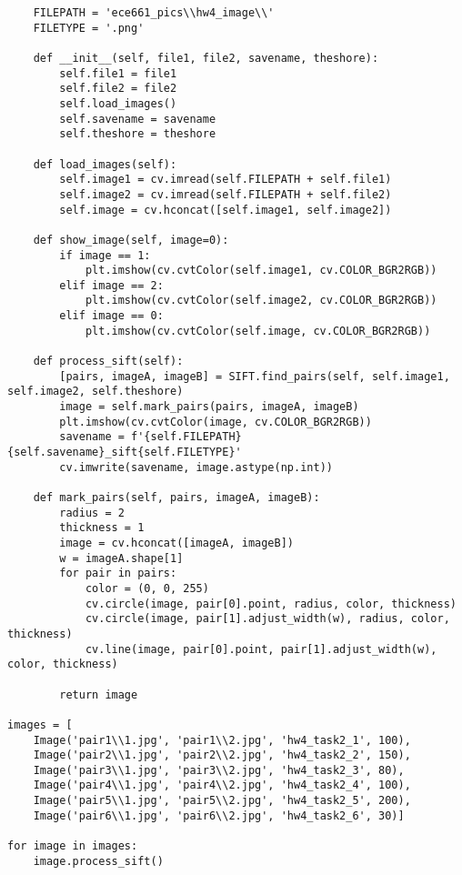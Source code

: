 \documentclass[11pt]{article}
\begin{document}
\begin{lstlisting}
    FILEPATH = 'ece661_pics\\hw4_image\\'
    FILETYPE = '.png'

    def __init__(self, file1, file2, savename, theshore):
        self.file1 = file1
        self.file2 = file2
        self.load_images()
        self.savename = savename
        self.theshore = theshore

    def load_images(self):
        self.image1 = cv.imread(self.FILEPATH + self.file1)
        self.image2 = cv.imread(self.FILEPATH + self.file2)
        self.image = cv.hconcat([self.image1, self.image2])

    def show_image(self, image=0):
        if image == 1:
            plt.imshow(cv.cvtColor(self.image1, cv.COLOR_BGR2RGB))
        elif image == 2:
            plt.imshow(cv.cvtColor(self.image2, cv.COLOR_BGR2RGB))
        elif image == 0:
            plt.imshow(cv.cvtColor(self.image, cv.COLOR_BGR2RGB))

    def process_sift(self):
        [pairs, imageA, imageB] = SIFT.find_pairs(self, self.image1, self.image2, self.theshore)
        image = self.mark_pairs(pairs, imageA, imageB)
        plt.imshow(cv.cvtColor(image, cv.COLOR_BGR2RGB))
        savename = f'{self.FILEPATH}{self.savename}_sift{self.FILETYPE}'
        cv.imwrite(savename, image.astype(np.int))

    def mark_pairs(self, pairs, imageA, imageB):
        radius = 2
        thickness = 1
        image = cv.hconcat([imageA, imageB])
        w = imageA.shape[1]
        for pair in pairs:
            color = (0, 0, 255)
            cv.circle(image, pair[0].point, radius, color, thickness)
            cv.circle(image, pair[1].adjust_width(w), radius, color, thickness)
            cv.line(image, pair[0].point, pair[1].adjust_width(w), color, thickness)

        return image

images = [
    Image('pair1\\1.jpg', 'pair1\\2.jpg', 'hw4_task2_1', 100),
    Image('pair2\\1.jpg', 'pair2\\2.jpg', 'hw4_task2_2', 150),
    Image('pair3\\1.jpg', 'pair3\\2.jpg', 'hw4_task2_3', 80),
    Image('pair4\\1.jpg', 'pair4\\2.jpg', 'hw4_task2_4', 100),
    Image('pair5\\1.jpg', 'pair5\\2.jpg', 'hw4_task2_5', 200),
    Image('pair6\\1.jpg', 'pair6\\2.jpg', 'hw4_task2_6', 30)]

for image in images:
    image.process_sift()

\end{lstlisting}

\end{document}
